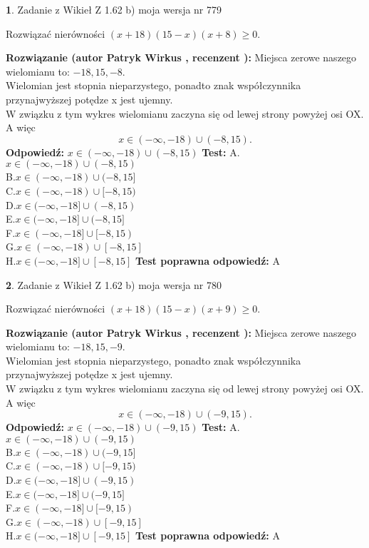 \documentclass[12pt, a4paper]{article}
\theoremstyle{definition} %
\newtheorem{zad}{}
\newcommand{\zadStart}[1]{\begin{zad}#1\newline}
\newcommand{\zadStop}{\end{zad}}
\newcommand{\rozwStart}[2]{\noindent \textbf{Rozwiązanie (autor #1 , recenzent #2): }\newline}
\newcommand{\rozwStop}{\newline}
\newcommand{\odpStart}{\noindent \textbf{Odpowiedź:}\newline}
\newcommand{\odpStop}{\newline}
\newcommand{\testStart}{\noindent \textbf{Test:}\newline}
\newcommand{\testStop}{\newline}
\newcommand{\kluczStart}{\noindent \textbf{Test poprawna odpowiedź:}\newline}
\newcommand{\kluczStop}{\newline}
\begin{document}
\zadStart{Zadanie z Wikieł Z 1.62 b) moja wersja nr 779}

Rozwiązać nierówności $(x+18)(15-x)(x+8)\ge0$.
\zadStop
\rozwStart{Patryk Wirkus}{}
Miejsca zerowe naszego wielomianu to: $-18, 15, -8$.\\
Wielomian jest stopnia nieparzystego, ponadto znak współczynnika przy\linebreak najwyższej potędze x jest ujemny.\\ W związku z tym wykres wielomianu zaczyna się od lewej strony powyżej osi OX. A więc $$x \in (-\infty,-18) \cup (-8,15).$$
\rozwStop
\odpStart
$x \in (-\infty,-18) \cup (-8,15)$
\odpStop
\testStart
A.$x \in (-\infty,-18) \cup (-8,15)$\\
B.$x \in (-\infty,-18) \cup (-8,15]$\\
C.$x \in (-\infty,-18) \cup [-8,15)$\\
D.$x \in (-\infty,-18] \cup (-8,15)$\\
E.$x \in (-\infty,-18] \cup (-8,15]$\\
F.$x \in (-\infty,-18] \cup [-8,15)$\\
G.$x \in (-\infty,-18) \cup [-8,15]$\\
H.$x \in (-\infty,-18] \cup [-8,15]$
\testStop
\kluczStart
A
\kluczStop



\zadStart{Zadanie z Wikieł Z 1.62 b) moja wersja nr 780}

Rozwiązać nierówności $(x+18)(15-x)(x+9)\ge0$.
\zadStop
\rozwStart{Patryk Wirkus}{}
Miejsca zerowe naszego wielomianu to: $-18, 15, -9$.\\
Wielomian jest stopnia nieparzystego, ponadto znak współczynnika przy\linebreak najwyższej potędze x jest ujemny.\\ W związku z tym wykres wielomianu zaczyna się od lewej strony powyżej osi OX. A więc $$x \in (-\infty,-18) \cup (-9,15).$$
\rozwStop
\odpStart
$x \in (-\infty,-18) \cup (-9,15)$
\odpStop
\testStart
A.$x \in (-\infty,-18) \cup (-9,15)$\\
B.$x \in (-\infty,-18) \cup (-9,15]$\\
C.$x \in (-\infty,-18) \cup [-9,15)$\\
D.$x \in (-\infty,-18] \cup (-9,15)$\\
E.$x \in (-\infty,-18] \cup (-9,15]$\\
F.$x \in (-\infty,-18] \cup [-9,15)$\\
G.$x \in (-\infty,-18) \cup [-9,15]$\\
H.$x \in (-\infty,-18] \cup [-9,15]$
\testStop
\kluczStart
A
\kluczStop
\end{document}
